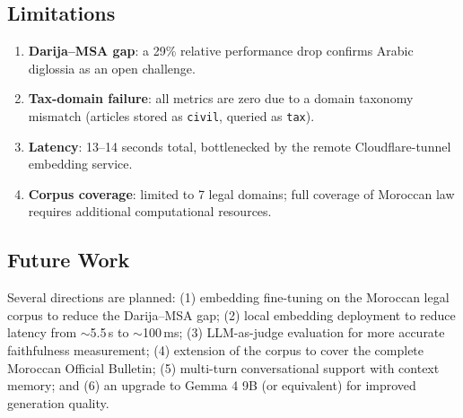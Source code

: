 \subsection{Limitations}

\begin{enumerate}
  \item \textbf{Darija--MSA gap}: a 29\% relative performance drop confirms
        Arabic diglossia as an open challenge.
  \item \textbf{Tax-domain failure}: all metrics are zero due to a domain
        taxonomy mismatch (articles stored as \texttt{civil}, queried as
        \texttt{tax}).
  \item \textbf{Latency}: 13--14 seconds total, bottlenecked by the remote
        Cloudflare-tunnel embedding service.
  \item \textbf{Corpus coverage}: limited to 7 legal domains; full coverage
        of Moroccan law requires additional computational resources.
\end{enumerate}

\subsection{Future Work}

Several directions are planned: (1) embedding fine-tuning on the Moroccan
legal corpus to reduce the Darija--MSA gap; (2) local embedding deployment to
reduce latency from $\sim$5.5\,s to $\sim$100\,ms; (3) LLM-as-judge evaluation
for more accurate faithfulness measurement; (4) extension of the corpus to
cover the complete Moroccan Official Bulletin; (5) multi-turn conversational
support with context memory; and (6) an upgrade to Gemma 4 9B (or equivalent)
for improved generation quality.
